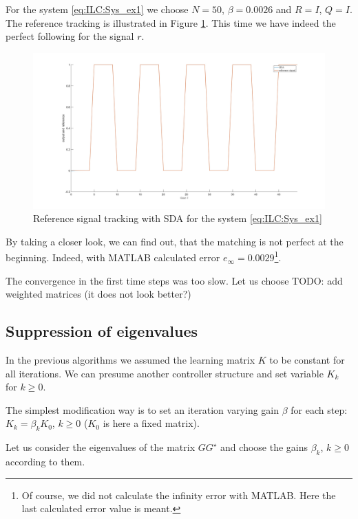 \begin{exam}
	For the system \eqref{eq:ILC:Sys_ex1} we choose $N = 50$, $\beta = 0.0026$ and $R = I$, $Q = I$. The reference tracking is illustrated in Figure \ref{img:ILC:Ex1_SDA50}. This time we have indeed the perfect following for the signal $r$. 
	
	\begin{figure}[ht]
		\centering
	\includegraphics[width=\textwidth]{fig/Ex1_SDA50.jpg}
	\caption{Reference signal tracking with SDA for the system \eqref{eq:ILC:Sys_ex1}}
	\label{img:ILC:Ex1_SDA50}
\end{figure}
	
By taking a closer look, we can find out, that the matching is not perfect at the beginning. Indeed, with MATLAB calculated  error 
$e_{\infty} = 0.0029$\footnote{Of course, we did not calculate the infinity error with MATLAB. Here the last calculated error value is meant.}. 	

The convergence in the first time steps was too slow. Let us choose 
TODO: add weighted matrices (it does not look better?)

\end{exam}


\subsection{Suppression of eigenvalues} 

In the previous algorithms we assumed the learning matrix $K$ to be constant for all iterations.
We can presume another controller structure and set variable $K_k$ for $k\geq 0$. 

The simplest modification way is to set an iteration varying gain $\beta$ for each step: $K_k = \beta_k K_0$, $k\geq 0$ ($K_0$ is here a fixed matrix).

Let us consider the eigenvalues of the matrix $GG^\star$ and choose the gains $\beta_k$, $k \geq 0$ according to them. 

